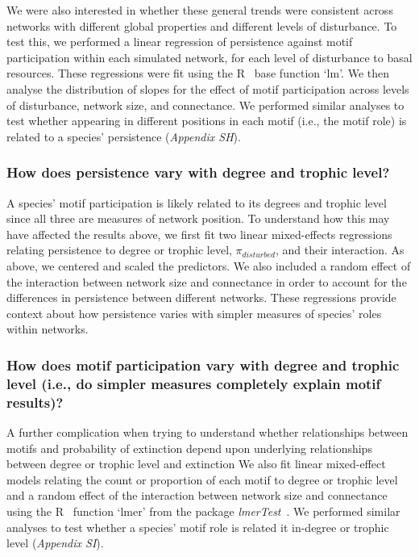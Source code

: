 \documentclass[12pt]{article}
\begin{document}
\begin{spacing}{2.0}
            We were also interested in whether these general trends were consistent across networks with different global properties and different levels of disturbance. 
            To test this, we performed a linear regression of persistence against motif participation within each simulated network, for each level of disturbance to basal resources.
            These regressions were fit using the R~\citep{R} base function `lm'.
            We then analyse the distribution of slopes for the effect of motif participation across levels of disturbance, network size, and connectance. 
            We performed similar analyses to test whether appearing in different positions in each motif (i.e., the motif role) is related to a species' persistence (\emph{Appendix SH}).

        \subsubsection*{How does persistence vary with degree and trophic level?}
        
            A species' motif participation is likely related to its degrees and trophic level since all three are measures of network position.
            To understand how this may have affected the results above, we first fit two linear mixed-effects regressions relating persistence to degree or trophic level, $\pi_{disturbed}$, and their interaction.
            As above, we centered and scaled the predictors.
            We also included a random effect of the interaction between network size and connectance in order to account for the differences in persistence between different networks. 
            These regressions provide context about how persistence varies with simpler measures of species' roles within networks.
                    
        
        \subsubsection*{How does motif participation vary with degree and trophic level (i.e., do simpler measures completely explain motif results)?}

            A further complication when trying to understand whether relationships between motifs and probability of extinction depend upon underlying relationships between degree or trophic level and extinction 
            We also fit linear mixed-effect models relating the count or proportion of each motif to degree or trophic level and a random effect of the interaction between network size and connectance using the R~\citep{R} function `lmer' from the package \emph{lmerTest}~\citep{lmerTest}.
            We performed similar analyses to test whether a species' motif role is related it in-degree or trophic level (\emph{Appendix SI}).
        

\end{spacing}
\end{document}
